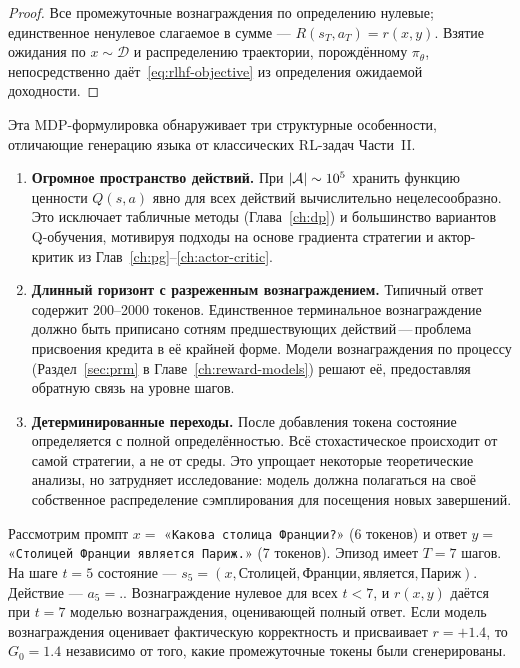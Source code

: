 \begin{proof}
Все промежуточные вознаграждения по определению нулевые; единственное ненулевое слагаемое в сумме --- $R(s_T, a_T) = r(x, y)$. Взятие ожидания по $x \sim \mathcal{D}$ и распределению траектории, порождённому $\pi_\theta$, непосредственно даёт~\eqref{eq:rlhf-objective} из определения ожидаемой доходности.
\end{proof}

Эта MDP-формулировка обнаруживает три структурные особенности, отличающие генерацию языка от классических RL-задач Части~II.

\begin{remark}
\label{rem:lm-mdp-features}
\begin{enumerate}[leftmargin=*]
  \item \textbf{Огромное пространство действий.} При $|\mathcal{A}| \sim 10^5$ хранить функцию ценности $Q(s, a)$ явно для всех действий вычислительно нецелесообразно. Это исключает табличные методы (Глава~\ref{ch:dp}) и большинство вариантов Q-обучения, мотивируя подходы на основе градиента стратегии и актор-критик из Глав~\ref{ch:pg}--\ref{ch:actor-critic}.
  \item \textbf{Длинный горизонт с разреженным вознаграждением.} Типичный ответ содержит 200--2000 токенов. Единственное терминальное вознаграждение должно быть приписано сотням предшествующих действий\,---\,проблема присвоения кредита в её крайней форме. Модели вознаграждения по процессу (Раздел~\ref{sec:prm} в Главе~\ref{ch:reward-models}) решают её, предоставляя обратную связь на уровне шагов.
  \item \textbf{Детерминированные переходы.} После добавления токена состояние определяется с полной определённостью. Всё стохастическое происходит от самой стратегии, а не от среды. Это упрощает некоторые теоретические анализы, но затрудняет исследование: модель должна полагаться на своё собственное распределение сэмплирования для посещения новых завершений.
\end{enumerate}
\end{remark}

\begin{example}
\label{ex:token-mdp-example}
Рассмотрим промпт $x = $ «\texttt{Какова столица Франции?}» (6 токенов) и ответ $y = $ «\texttt{Столицей Франции является Париж.}» (7 токенов). Эпизод имеет $T = 7$ шагов. На шаге $t = 5$ состояние --- $s_5 = (x, \allowbreak \texttt{Столицей}, \allowbreak \texttt{Франции}, \allowbreak \texttt{является}, \allowbreak \texttt{Париж})$. Действие --- $a_5 = \texttt{.}$. Вознаграждение нулевое для всех $t < 7$, и $r(x, y)$ даётся при $t = 7$ моделью вознаграждения, оценивающей полный ответ. Если модель вознаграждения оценивает фактическую корректность и присваивает $r = +1.4$, то $G_0 = 1.4$ независимо от того, какие промежуточные токены были сгенерированы.
\end{example}

